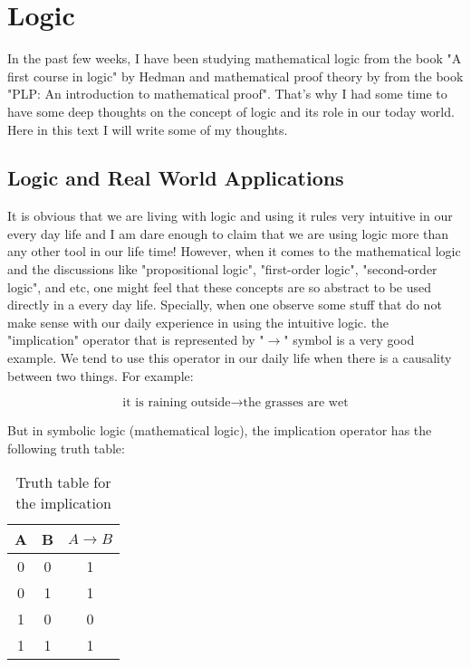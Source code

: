 \section{Logic}

In the past few weeks, I have been studying mathematical logic from the book  "A first course in logic" by Hedman and mathematical proof theory by from the book "PLP: An introduction to mathematical proof". That's why I had some time to have some deep thoughts on the concept of logic and its role in our today world. Here in this text I will write some of my thoughts.

\subsection{Logic and Real World Applications}

It is obvious that we are living with logic and using it rules very intuitive in our every day life and I am dare enough to claim that we are using logic more than any other tool in our life time! However, when it comes to the mathematical logic and the discussions like "propositional logic", "first-order logic", "second-order logic", and etc, one might feel that these concepts are so abstract to be used directly in a every day life. Specially, when one observe some stuff that do not make sense with our daily experience in using the intuitive logic. the "implication" operator that is represented by "$ \rightarrow $" symbol is a very good example. We tend to use this operator in our daily life when there is a causality between two things. For example:


\begin{equation*}
	\text{it is raining outside} \rightarrow \text{the grasses are wet}
\end{equation*}

But in symbolic logic (mathematical logic), the implication operator has the following truth table:

\begin{table}[h!]
	\centering
	\begin{tabular}{|c|c|c|}
		\hline
		A & B & $A \rightarrow B$ \\ \hline
		0 & 0 & 1                 \\ \hline
		0 & 1 & 1                 \\ \hline
		1 & 0 & 0                 \\ \hline
		1 & 1 & 1                 \\ \hline
	\end{tabular}
	\caption{Truth table for the implication}
	\label{tab:truthTable}
\end{table}


